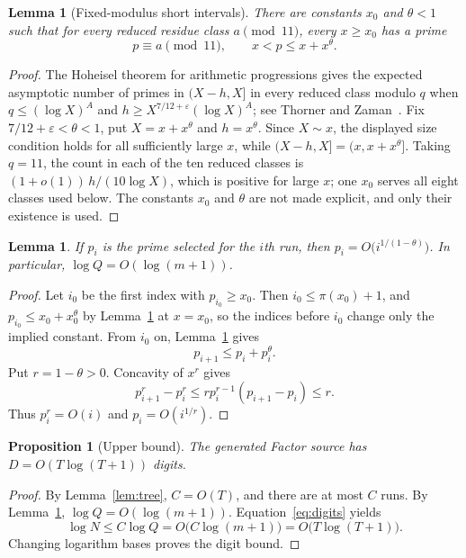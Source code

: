 \documentclass[11pt]{article}
\newtheorem{lemma}[theorem]{Lemma}
\newtheorem{proposition}[theorem]{Proposition}
\theoremstyle{remark}
\begin{document}
\begin{lemma}[Fixed-modulus short intervals]\label{lem:short}
There are constants $x_0$ and $\theta<1$ such that for every reduced
residue class $a\pmod{11}$, every $x\ge x_0$ has a prime
\[
  p\equiv a\pmod {11},
  \qquad x<p\le x+x^\theta.
\]
\end{lemma}

\begin{proof}
The Hoheisel theorem for arithmetic progressions gives the expected
asymptotic number of primes in $(X-h,X]$ in every reduced class modulo $q$
when $q\le(\log X)^A$ and
$h\ge X^{7/12+\varepsilon}(\log X)^A$; see Thorner and
Zaman~\cite[Section~1.2]{thorner-zaman}.  Fix
$7/12+\varepsilon<\theta<1$, put
$X=x+x^\theta$ and $h=x^\theta$.  Since $X\sim x$, the displayed size
condition holds for all sufficiently large $x$, while
$(X-h,X]=(x,x+x^\theta]$.  Taking $q=11$, the count in each of the ten
reduced classes is $(1+o(1))\,h/(10\log X)$, which is positive for large
$x$; one $x_0$ serves all eight classes used below.  The constants $x_0$ and
$\theta$ are not made explicit, and only their existence is used.
\end{proof}

\begin{lemma}\label{lem:adaptive}
If $p_i$ is the prime selected for the $i$th run, then
$p_i=O\bigl(i^{1/(1-\theta)}\bigr)$.  In particular,
$\log Q=O(\log(m+1))$.
\end{lemma}

\begin{proof}
Let $i_0$ be the first index with $p_{i_0}\ge x_0$.  Then
$i_0\le\pi(x_0)+1$, and $p_{i_0}\le x_0+x_0^\theta$ by Lemma~\ref{lem:short}
at $x=x_0$, so the indices before $i_0$ change only the implied constant.
From $i_0$ on, Lemma~\ref{lem:short} gives
\[
  p_{i+1}\le p_i+p_i^\theta.
\]
Put $r=1-\theta>0$.  Concavity of $x^r$ gives
\[
  p_{i+1}^r-p_i^r
  \le r p_i^{r-1}(p_{i+1}-p_i)\le r.
\]
Thus $p_i^r=O(i)$ and $p_i=O(i^{1/r})$.
\end{proof}

\begin{proposition}[Upper bound]\label{prop:upper}
The generated Factor source has $D=O(T\log(T+1))$ digits.
\end{proposition}

\begin{proof}
By Lemma~\ref{lem:tree}, $C=O(T)$, and there are at most $C$ runs.  By
Lemma~\ref{lem:adaptive},
$\log Q=O(\log(m+1))$.  Equation~\eqref{eq:digits} yields
\[
  \log N\le C\log Q
  =O\bigl(C\log(m+1)\bigr)
  =O\bigl(T\log(T+1)\bigr).
\]
Changing logarithm bases proves the digit bound.
\end{proof}
\end{document}
